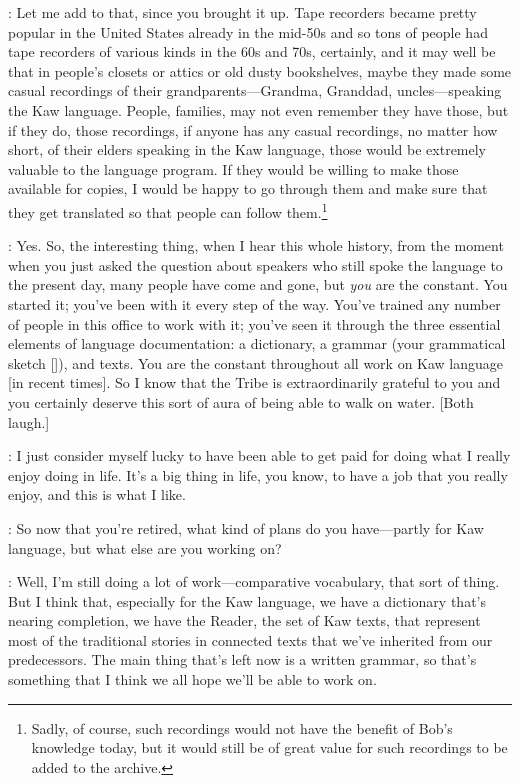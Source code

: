 \documentclass[output=paper]{LSP/langsci}
\begin{document}
: Let me add to that, since you brought it up. Tape recorders became pretty popular in the United States already in the mid-50s and so tons of people had tape recorders of various kinds in the 60s and 70s, certainly, and it may well be that in people's closets or attics or old dusty bookshelves, maybe they made some casual recordings of their grandparents---Grandma, Granddad, uncles---speaking the Kaw language. People, families, may not even remember they have those, but if they do, those recordings, if anyone has any casual recordings, no matter how short, of their elders speaking in the Kaw language, those would be extremely valuable to the language program. If they would be willing to make those available for copies, I would be happy to go through them and make sure that they get translated so that people can follow them.\footnote{Sadly, of course, such recordings would not have the benefit of Bob's knowledge today, but it would still be of great value for such recordings to be added to the archive.}

: Yes. So, the interesting thing, when I hear this whole history, from the moment when you just asked the question about speakers who still spoke the language to the present day, many people have come and gone, but \textit{you} are the constant. You started it; you've been with it every step of the way. You've trained any number of people in this office to work with it; you've seen it through the three essential elements of language documentation: a dictionary, a grammar (your grammatical sketch [\citealt{Rankin1989}]), and texts. You are the constant throughout all work on Kaw language [in recent times]. So I know that the Tribe is extraordinarily grateful to you and you certainly deserve this sort of aura of being able to walk on water. [Both laugh.]

: I just consider myself lucky to have been able to get paid for doing what I really enjoy doing in life. It's a big thing in life, you know, to have a job that you really enjoy, and this is what I like.

: So now that you're retired, what kind of plans do you have---partly for Kaw language, but what else are you working on?

: Well, I'm still doing a lot of work---comparative vocabulary, that sort of thing. But I think that, especially for the Kaw language, we have a dictionary that's nearing completion, we have the Reader, the set of Kaw texts, that represent most of the traditional stories in connected texts that we've inherited from our predecessors. The main thing that's left now is a written grammar, so that's something that I think we all hope we'll be able to work on.
\end{document}
